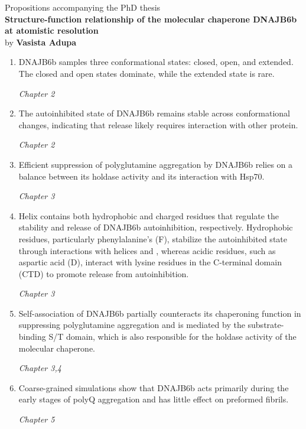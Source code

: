 \documentclass[12pt,a4paper]{article}
\newcommand{\croman}[1]
{\MakeUppercase{\romannumeral #1}}
\newcommand{\ThesisTitle}{Structure-function relationship of the molecular chaperone DNAJB6b at atomistic resolution} %
\newcommand{\ThesisAuthor}{Vasista Adupa}
\newcommand{\chapterref}[1]{%
 \par\hfill\textit{Chapter #1}%
}
\begin{document}
\thispagestyle{empty}

\begin{center}
 Propositions accompanying the PhD thesis\\[1.5ex]
 \textbf{\ThesisTitle}\\[1.5ex]
  by \textbf{\ThesisAuthor}
\end{center}

\vspace{3ex}

\begin{enumerate}[label=\arabic*., leftmargin=*, itemsep=1.8ex, topsep=1.0ex]

  \item DNAJB6b samples three conformational states: closed, open, and extended. The closed and open states dominate, while the extended state is rare.
\chapterref{2}

\item The autoinhibited state of DNAJB6b remains stable across conformational changes, indicating that release likely requires interaction with other protein.
\chapterref{2}

\item Efficient suppression of polyglutamine aggregation by DNAJB6b relies on a balance between its holdase activity and its interaction with Hsp70.
\chapterref{3}

\item Helix \croman{5} contains both hydrophobic and charged residues that regulate the stability and release of DNAJB6b autoinhibition, respectively.
Hydrophobic residues, particularly phenylalanine's (F), stabilize the autoinhibited state through interactions with helices \croman{2} and \croman{3}, whereas acidic residues, such as aspartic acid (D), interact with lysine residues in the C-terminal domain (CTD) to promote release from autoinhibition.
\chapterref{3}

\item Self-association of DNAJB6b partially counteracts its chaperoning function in suppressing polyglutamine aggregation and is mediated by the substrate-binding S/T domain, which is also responsible for the holdase activity of the molecular chaperone.
\chapterref{3,4}

\item Coarse-grained simulations show that DNAJB6b acts primarily during the early stages of polyQ aggregation and has little effect on preformed fibrils.
\chapterref{5}

\end{enumerate}
\end{document}
